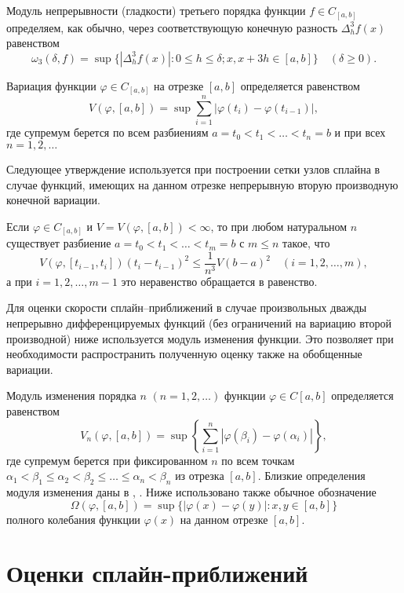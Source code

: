 Модуль непрерывности (гладкости) третьего порядка функции $f\in C_{[a,b]}$ определяем,
как обычно, через соответствующую конечную разность $\Delta_h^3 f(x)$ равенством
$$
\omega_3(\delta, f)=\sup\{|\Delta_h^3 f(x)|: 0\leqslant h\leqslant \delta;
x, x+3h\in[a,b]\}\quad (\delta\geqslant 0).
$$

Вариация функции $\varphi\in C_{[a,b]}$ на отрезке $[a,b]$ определяется равенством
$$
V(\varphi, [a,b])=\sup\sum_{i=1}^n |\varphi (t_i)-\varphi(t_{i-1})|,
$$
где супремум берется по всем разбиениям $a=t_0<t_1<\dots<t_n=b$ и при всех $n=1,2,\dots$

Следующее утверждение используется при построении сетки узлов сплайна в случае функций,
 имеющих на данном отрезке непрерывную вторую производную конечной вариации.
\begin{lemma}\label{rarkram-lem1}
Если $\varphi\in C_{[a,b]}$ и $V=V(\varphi, [a,b])<\infty$, то при любом натуральном
$n$ существует разбиение   $a=t_0<t_1<\dots<t_m=b$ с $m\leqslant n$ такое, что
$$
V(\varphi, [t_{i-1}, t_i])(t_i-t_{i-1})^2\leqslant \frac 1{n^3} V(b-a)^2\quad (i=1,2,\dots,m),
$$
а при $i=1,2,\dots,m-1$ это неравенство обращается в равенство.
\end{lemma}
Для оценки скорости сплайн--приближений в случае произвольных дважды
 непрерывно дифференцируемых функций (без ограничений на вариацию
второй производной) ниже используется модуль изменения функции. Это
позволяет при необходимости распространить полученную оценку также на обобщенные вариации.

Модуль изменения порядка $n$ $(n=1,2,\dots)$ функции $\varphi \in C[a,b]$ определяется
равенством \cite{rark14}
$$
V_n(\varphi, [a,b])=\sup\left\{\sum_{i=1}^n |\varphi(\beta_i)-\varphi(\alpha_i)|\right\},
$$
где супремум берется при фиксированном $n$ по всем точкам $\alpha_1<\beta_1\leqslant
 \alpha_2<\beta_2\leqslant \dots\leqslant \alpha_n<\beta_n$ из отрезка $[a,b]$.
Близкие определения модуля изменения даны в \cite{rark15}, \cite{rark16}.
Ниже использовано также обычное обозначение
$$
\Omega(\varphi, [a,b])=\sup\{|\varphi(x)-\varphi(y)|: x,y\in [a,b]\}
$$
полного колебания функции $\varphi(x)$ на данном отрезке $[a,b]$.

\section{Оценки сплайн-приближений}

